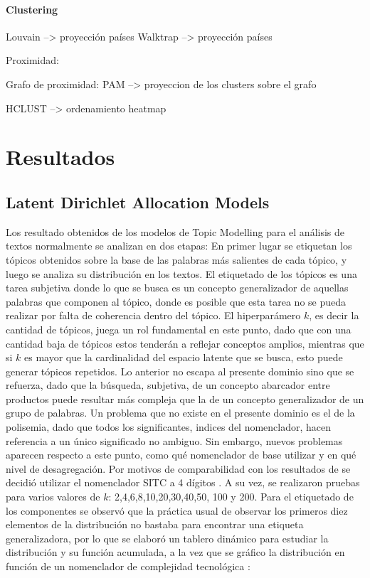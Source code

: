 \documentclass[class=article, crop=false]{standalone}
\begin{document}
\paragraph{Clustering}

Louvain --> proyección países
Walktrap --> proyección países



Proximidad:

Grafo de proximidad: PAM --> proyeccion de los clusters sobre el grafo

HCLUST --> ordenamiento heatmap



\section{Resultados}

\subsection{Latent Dirichlet Allocation Models}

Los resultado obtenidos de los modelos de Topic Modelling para el análisis de textos normalmente se analizan en dos etapas: En primer lugar se etiquetan los tópicos obtenidos sobre la base de las palabras más salientes de cada tópico, y luego se analiza su distribución en los textos. El etiquetado de los tópicos es una tarea subjetiva donde lo que se busca es un concepto generalizador de aquellas palabras que componen al tópico, donde es posible que esta tarea no se pueda realizar por falta de coherencia dentro del tópico. El hiperparámero $k$, es decir la cantidad de tópicos, juega un rol fundamental en este punto, dado que con una cantidad baja de tópicos estos tenderán a reflejar conceptos amplios, mientras que si $k$ es mayor que la cardinalidad del espacio latente que se busca, esto puede generar tópicos repetidos. 
Lo anterior no escapa al presente dominio sino que se refuerza, dado que la búsqueda, subjetiva, de un concepto abarcador entre productos puede resultar más compleja que la de un concepto generalizador de un grupo de palabras. Un problema que no existe en el presente dominio es el de la polisemia, dado que todos los significantes, indices del nomenclador, hacen referencia a un único significado no ambiguo. Sin embargo, nuevos problemas aparecen respecto a este punto, como qué nomenclador de base utilizar y en qué nivel de desagregación. Por motivos de comparabilidad con los resultados de \cite{molinari2016especializacion} se decidió utilizar el nomenclador SITC a 4 dígitos \citep{un2006standard}. A su vez, se realizaron pruebas para varios valores de $k$: 2,4,6,8,10,20,30,40,50, 100 y 200. Para el etiquetado de los componentes se observó que la práctica usual de observar los primeros diez elementos de la distribución no bastaba para encontrar una etiqueta generalizadora, por lo que se elaboró un tablero dinámico para estudiar la distribución y su función acumulada, a la vez que se gráfico la distribución en función de un nomenclador de complejidad tecnológica \citep{lall2000technological}: 
\end{document}
